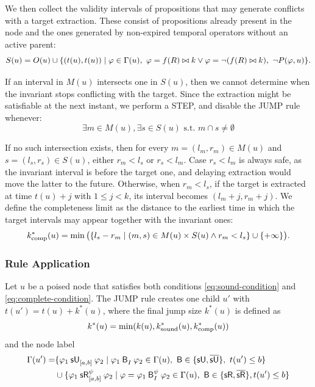 \documentclass{easychair}
\begin{document}
We then collect the validity intervals of propositions that may generate conflicts with a target extraction.
These consist of propositions already present in the node and the ones generated by non-expired temporal operators without an active parent:
%
\[
    S(u) = O(u)
    \cup
    \{ 
        (t(u),t(u)) \mid
        \varphi \in \Gamma(u),\
        \varphi = f(R)\bowtie k \lor \varphi = \neg(f(R)\bowtie k),\
        \lnot P(\varphi,u)
     \}.
\]

If an interval in $M(u)$ intersects one in $S(u)$, then we cannot determine when the invariant stops conflicting with the target.
Since the extraction might be satisfiable at the next instant, we perform a \textsf{STEP}, and disable the \textsf{JUMP} rule whenever:
%
\begin{equation}
    \label{eq:complete-condition}
    \exists m \in M(u), \exists s \in S(u) \text{ s.t. } m \cap s \neq \emptyset
\end{equation}

If no such intersection exists, then for every
$m=(l_m,r_m)\in M(u)$ and $s=(l_s,r_s)\in S(u)$, either $r_m<l_s$ or $r_s<l_m$.
%
Case $r_s < l_m$ is always safe, as the invariant interval is before the target one, and delaying extraction would move the latter to the future.
%
Otherwise, when $r_m < l_s$, if the target is extracted at time $t(u)+j$ with $1 \leq j < k$, its interval becomes $(l_m+j,r_m+j)$.
We define the completeness limit as the distance to the earliest time in which the target intervals may appear together with the invariant ones:
%
\begin{align*}
    k^{\ast}_{\text{comp}}(u) =
    \min\big(\{ l_s - r_m \mid (m, s) \in M(u) \times S(u) \land r_m < l_s \} \cup \{ +\infty \}\big).
\end{align*}



\subsubsection{Rule Application}

Let $u$ be a poised node that satisfies both conditions \eqref{eq:sound-condition} and \eqref{eq:complete-condition}.
The \textsf{JUMP} rule creates one child $u'$ with $t(u') = t(u) + k^{\ast}(u)$, where the final jump size $k^{\ast}(u)$ is defined as
\[
    k^{\ast}(u) = \min(k(u), k^{\ast}_{\text{sound}}(u), k^{\ast}_{\text{comp}}(u))
\vspace{-2ex}
\]
and the node label
%
\begin{align}
    \Gamma(u')=
    &\set{\suntil{[a,b]}{\varphi_1}{\varphi_2}\mid \anybinop{I}{\varphi_1}{\varphi_2}\in\Gamma(u), \  \mathsf{B}\in\set{\suntilop,\marked{\suntilop}}, \ t(u') \leq b}\label{eq:jump-until}\\
    &\cup\set{\srelease[\psi]{[a,b]}{\varphi_1}{\varphi_2} \mid \varphi = \anybinop[\psi]{I}{\varphi_1}{\varphi_2}\in\Gamma(u), \ \mathsf{B}\in\set{\sreleaseop,\marked{\sreleaseop}}, t(u') \leq b}\label{eq:jump-release}
\end{align}
\end{document}
